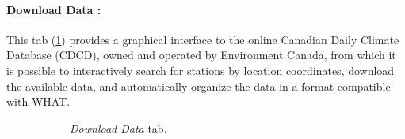 \documentclass[WHATMANUAL.tex]{subfiles}
\begin{document}
\newpage

\paragraph{Download Data :} This tab (\cref{subfig:ScnShot_000}) provides a graphical interface to the online Canadian Daily Climate Database (CDCD), owned and operated by Environment Canada, from which it is possible to interactively search for stations by location coordinates, download the available data, and automatically organize the data in a format compatible with WHAT.

\begin{figure}[!ht]
    \centering
    \begin{subfigure}[t]{0.45\textwidth}
        \setlength{\fboxsep}{0pt}
        \caption{\emph{Download Data} tab.}
        \label{subfig:ScnShot_000}                
    \end{subfigure}%
    \hspace{0.5cm}
    \begin{subfigure}[t]{0.45\textwidth}
        \setlength{\fboxsep}{0pt}

\end{subfigure}
\end{figure}
\end{document}
